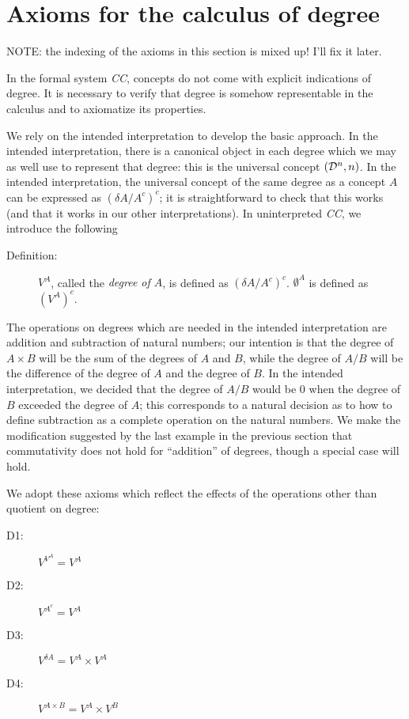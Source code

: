 \documentclass{article}
\begin{document}
\section{Axioms for the calculus of degree}

NOTE: the indexing of the axioms in this section is mixed up!  I'll
fix it later.

In the formal system {\em CC\/}, concepts do not come with explicit
indications of degree.  It is necessary to verify that degree is
somehow representable in the calculus and to axiomatize its
properties.

We rely on the intended interpretation to develop the basic approach.
In the intended interpretation, there is a canonical object in each
degree which we may as well use to represent that degree: this is the
universal concept $({\cal D}^n,n)$.  In the intended interpretation,
the universal concept of the same degree as a concept $A$ can be
expressed as $(\delta A/A^c)^c$; it is straightforward to check that
this works (and that it works in our other interpretations).  In
uninterpreted {\em CC\/}, we introduce the following

\begin{description}
\item[Definition:]  

$V^A$, called the {\em degree of $A$\/}, is defined as $(\delta
A/A^c)^c$.  $\emptyset^A$ is defined as $(V^A)^c$.

\end{description}

The operations on degrees which are needed in the intended
interpretation are addition and subtraction of natural numbers; our
intention is that the degree of $A \times B$ will be the sum of the
degrees of $A$ and $B$, while the degree of $A/B$ will be the
difference of the degree of $A$ and the degree of $B$.  In the
intended interpretation, we decided that the degree of $A/B$ would be
0 when the degree of $B$ exceeded the degree of $A$; this corresponds
to a natural decision as to how to define subtraction as a complete
operation on the natural numbers.  We make the modification suggested
by the last example in the previous section that commutativity does
not hold for ``addition'' of degrees, though a special case will hold.

We adopt these axioms which reflect the effects of the operations
other than quotient on degree:

\begin{description}


\item[D1:]  $V^{V^A} = V^A$

\item[D2:]  $V^{A^c} = V^A$

\item[D3:]  $V^{\delta A} = V^A \times V^A$

\item[D4:]  $V^{A \times B} = V^A \times V^B$

\end{description}
\end{document}
